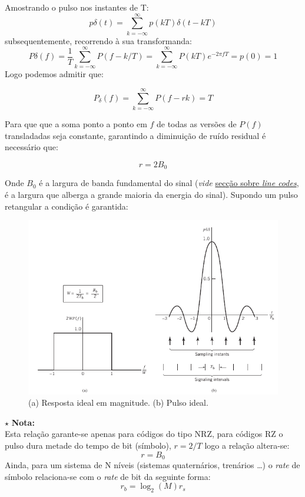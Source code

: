 \noindent Amostrando o pulso nos instantes de T: 
$$
    p\delta(t) = \sum_{k = -\infty}^{\infty}p(kT)\delta(t - kT)
$$
\noindent subsequentemente, recorrendo à sua transformanda:
$$
    P\delta(f) = \frac{1}{T}\sum_{k = -\infty}^{\infty}P(f - k/T) = \sum_{k = -\infty}^{\infty}P(kT)e^{-2\pi f T} = p(0) = 1
$$
\clearpage
\noindent Logo podemos admitir que:

$$
    \boxed{P_\delta(f) = \sum_{k = -\infty}^{\infty}P(f - rk) = T}
$$

\noindent Para que que a soma ponto a ponto em $f$ de todas as versões de $P(f)$ transladadas seja constante, garantindo a diminuição de ruído residual é necessário que:

$$
    \boxed{r = 2B_0}
$$

\noindent Onde $B_0$ é a largura de banda fundamental do sinal (\textit{vide} \hyperref[line:unipolarNRZ]{secção sobre \textit{line codes}}, é a largura que alberga a grande maioria da energia do sinal). Supondo um pulso retangular a condição é garantida:

\begin{figure}[H]
    \centering
    \includegraphics[width = 1\linewidth]{img/digital/ISI/Nyq.png}
    \caption{ (a) Resposta ideal em magnitude. (b) Pulso ideal.}
    \label{fig:Nyq}
\end{figure}

\begin{mdframed}
$\pmb{\star}$ \textbf{Nota:}
\mbox{}\\
Esta relação garante-se apenas para códigos do tipo NRZ, para códigos RZ o pulso dura metade do tempo de bit (símbolo), $r = 2/T$ logo a relação altera-se:
$$
    \boxed{r = B_0}
$$
\noindent Ainda, para um sistema de N níveis (sistemas quaternários, trenários \dots) o \textit{rate} de símbolo relaciona-se com o \textit{rate} de bit da seguinte forma:
$$
\boxed{r_b = \log_2 (M) r_s}
$$
\end{mdframed}
\clearpage
